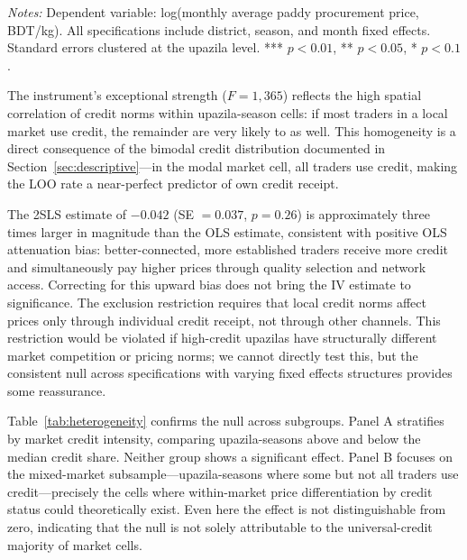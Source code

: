\documentclass[authoryear,preprint,review,12pt]{elsarticle}
\begin{document}
\begin{table}[htbp]
  \centering
  \caption{IV Robustness: 2SLS with Leave-One-Out Upazila-Season Credit Rate}
  \label{tab:iv}
  \begin{singlespace}
  \begin{threeparttable}
    
    \begin{tablenotes}\footnotesize
      \item \textit{Notes:} Dependent variable: log(monthly average paddy
      procurement price, BDT/kg). All specifications include district, season,
      and month fixed effects. Standard errors clustered at the upazila level.
      *** $p<0.01$, ** $p<0.05$, * $p<0.1$.
    \end{tablenotes}
  \end{threeparttable}
  \end{singlespace}
\end{table}

The instrument's exceptional strength ($F = 1{,}365$) reflects the high spatial
correlation of credit norms within upazila-season cells: if most traders in
a local market use credit, the remainder are very likely to as well. This
homogeneity is a direct consequence of the bimodal credit distribution documented
in Section~\ref{sec:descriptive}---in the modal market cell, all traders use
credit, making the LOO rate a near-perfect predictor of own credit receipt.

The 2SLS estimate of $-0.042$ (SE $= 0.037$, $p = 0.26$) is approximately
three times larger in magnitude than the OLS estimate, consistent with
positive OLS attenuation bias: better-connected, more established traders
receive more credit and simultaneously pay higher prices through quality
selection and network access. Correcting for this upward bias does not bring
the IV estimate to significance. The exclusion restriction requires that
local credit norms affect prices only through individual credit receipt,
not through other channels. This restriction would be violated if high-credit
upazilas have structurally different market competition or pricing norms;
we cannot directly test this, but the consistent null across specifications
with varying fixed effects structures provides some reassurance.

Table~\ref{tab:heterogeneity} confirms the null across subgroups. Panel A
stratifies by market credit intensity, comparing upazila-seasons above and
below the median credit share. Neither group shows a significant effect.
Panel B focuses on the mixed-market subsample---upazila-seasons where some
but not all traders use credit---precisely the cells where within-market
price differentiation by credit status could theoretically exist. Even here
the effect is not distinguishable from zero, indicating that the null is not
solely attributable to the universal-credit majority of market cells.
\end{document}
